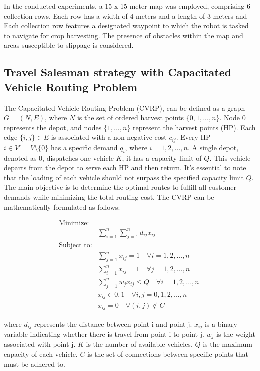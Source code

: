 \documentclass[conference]{IEEEtran}
\begin{document}
In the conducted experiments, a 15 x 15-meter map was employed, comprising 6 collection rows. Each row has a width of 4 meters and a length of 3 meters and Each collection row features a designated waypoint to which the robot is tasked to navigate for crop harvesting. The presence of obstacles within the map and areas susceptible to slippage is considered.


\subsection{Travel Salesman strategy with Capacitated Vehicle Routing Problem}
The Capacitated Vehicle Routing Problem (CVRP), can be defined as a graph $G = (N, E)$, where $N$ is the set of ordered harvest points $\{0, 1, . . . , n\}$. Node $0$ represents the depot, and nodes $\{1, . . . , n\}$ represent the harvest points (HP). Each edge $\{i, j\} \in E$ is associated with a non-negative cost $c_{ij}$. Every HP $i \in V' = V \setminus \{0\}$ has a specific demand $q_i$, where $i = 1, 2, . . . , n$. A single depot, denoted as $0$, dispatches one vehicle $K$, it has a capacity limit of $Q$. This vehicle departs from the depot to serve each HP and then return. It's essential to note that the loading of each vehicle should not surpass the specified capacity limit $Q$. The main objective is to determine the optimal routes to fulfill all customer demands while minimizing the total routing cost. The CVRP can be mathematically formulated as follows:

\begin{align*}
\text{Minimize:} & \ \\
& \sum_{i=1}^{n}\sum_{j=1}^{n} d_{ij} x_{ij} \ \\
\text{Subject to:} & \ \\
& \sum_{j=1}^{n} x_{ij} = 1 \quad \forall i = 1, 2, ..., n \ \\
& \sum_{i=1}^{n} x_{ij} = 1 \quad \forall j = 1, 2, ..., n \ \\
& \sum_{j=1}^{n} w_j x_{ij} \leq Q \quad \forall i = 1, 2, ..., n \ \\
& x_{ij} \in {0, 1} \quad \forall i, j = 0, 1, 2, ..., n \ \\
& x_{ij} = 0 \quad \forall (i,j) \notin C \
\end{align*}


\noindent where $d_{ij}$ represents the distance between point i and point j.
$x_{ij}$ is a binary variable indicating whether there is travel from point i to point j.
$w_j$ is the weight associated with point j.
$K$ is the number of available vehicles.
$Q$ is the maximum capacity of each vehicle.
$C$ is the set of connections between specific points that must be adhered to.
\end{document}
